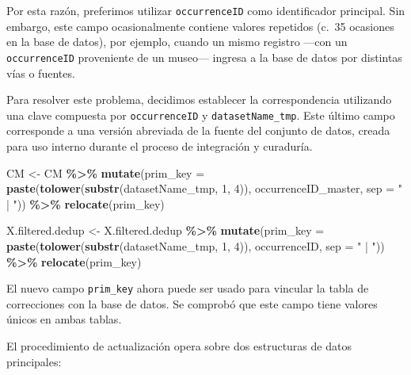 \documentclass[sn-apa,pdflatex]{sn-jnl}
\newenvironment{Shaded}{\begin{snugshade}}{\end{snugshade}}
\newcommand{\AttributeTok}[1]{\textcolor[rgb]{0.13,0.29,0.53}{#1}}
\newcommand{\DecValTok}[1]{\textcolor[rgb]{0.00,0.00,0.81}{#1}}
\newcommand{\FunctionTok}[1]{\textcolor[rgb]{0.13,0.29,0.53}{\textbf{#1}}}
\newcommand{\NormalTok}[1]{#1}
\newcommand{\OtherTok}[1]{\textcolor[rgb]{0.56,0.35,0.01}{#1}}
\newcommand{\SpecialCharTok}[1]{\textcolor[rgb]{0.81,0.36,0.00}{\textbf{#1}}}
\newcommand{\StringTok}[1]{\textcolor[rgb]{0.31,0.60,0.02}{#1}}
\begin{document}
Por esta razón, preferimos utilizar \texttt{occurrenceID} como
identificador principal. Sin embargo, este campo ocasionalmente contiene
valores repetidos (c.~35 ocasiones en la base de datos), por ejemplo,
cuando un mismo registro ---con un \texttt{occurrenceID} proveniente de
un museo--- ingresa a la base de datos por distintas vías o fuentes.

Para resolver este problema, decidimos establecer la correspondencia
utilizando una clave compuesta por \texttt{occurrenceID} y
\texttt{datasetName\_tmp}. Este último campo corresponde a una versión
abreviada de la fuente del conjunto de datos, creada para uso interno
durante el proceso de integración y curaduría.

\begin{Shaded}
\begin{Highlighting}[]
\NormalTok{CM }\OtherTok{\textless{}{-}}\NormalTok{ CM }\SpecialCharTok{\%\textgreater{}\%}
    \FunctionTok{mutate}\NormalTok{(}\AttributeTok{prim\_key =} \FunctionTok{paste}\NormalTok{(}\FunctionTok{tolower}\NormalTok{(}\FunctionTok{substr}\NormalTok{(datasetName\_tmp, }\DecValTok{1}\NormalTok{,}
        \DecValTok{4}\NormalTok{)), occurrenceID\_master, }\AttributeTok{sep =} \StringTok{" | "}\NormalTok{)) }\SpecialCharTok{\%\textgreater{}\%}
    \FunctionTok{relocate}\NormalTok{(prim\_key)}

\NormalTok{X.filtered.dedup }\OtherTok{\textless{}{-}}\NormalTok{ X.filtered.dedup }\SpecialCharTok{\%\textgreater{}\%}
    \FunctionTok{mutate}\NormalTok{(}\AttributeTok{prim\_key =} \FunctionTok{paste}\NormalTok{(}\FunctionTok{tolower}\NormalTok{(}\FunctionTok{substr}\NormalTok{(datasetName\_tmp, }\DecValTok{1}\NormalTok{,}
        \DecValTok{4}\NormalTok{)), occurrenceID, }\AttributeTok{sep =} \StringTok{" | "}\NormalTok{)) }\SpecialCharTok{\%\textgreater{}\%}
    \FunctionTok{relocate}\NormalTok{(prim\_key)}
\end{Highlighting}
\end{Shaded}

El nuevo campo \texttt{prim\_key} ahora puede ser usado para vincular la
tabla de correcciones con la base de datos. Se comprobó que este campo
tiene valores únicos en ambas tablas.

El procedimiento de actualización opera sobre dos estructuras de datos
principales:
\end{document}
